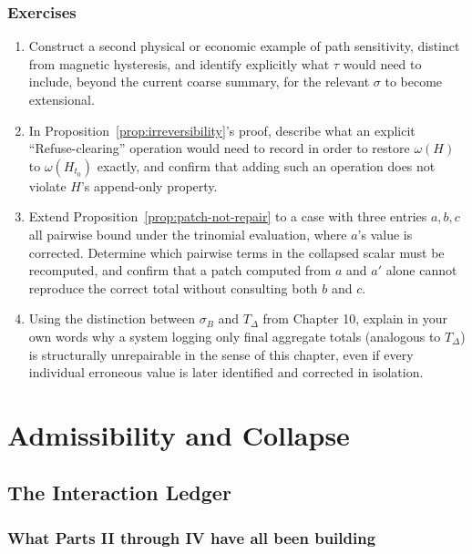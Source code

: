 \documentclass[11pt]{book}
\begin{document}
\section*{Exercises}
\begin{enumerate}
\item Construct a second physical or economic example of path sensitivity, distinct from magnetic hysteresis, and identify explicitly what $\tau$ would need to include, beyond the current coarse summary, for the relevant $\sigma$ to become extensional.
\item In Proposition~\ref{prop:irreversibility}'s proof, describe what an explicit ``Refuse-clearing'' operation would need to record in order to restore $\omega(H)$ to $\omega(H_{t_0})$ exactly, and confirm that adding such an operation does not violate $H$'s append-only property.
\item Extend Proposition~\ref{prop:patch-not-repair} to a case with three entries $a,b,c$ all pairwise bound under the trinomial evaluation, where $a$'s value is corrected. Determine which pairwise terms in the collapsed scalar must be recomputed, and confirm that a patch computed from $a$ and $a'$ alone cannot reproduce the correct total without consulting both $b$ and $c$.
\item Using the distinction between $\sigma_B$ and $T_\Delta$ from Chapter 10, explain in your own words why a system logging only final aggregate totals (analogous to $T_\Delta$) is structurally unrepairable in the sense of this chapter, even if every individual erroneous value is later identified and corrected in isolation.
\end{enumerate}

\part{Admissibility and Collapse}

\chapter{The Interaction Ledger}

\section{What Parts II through IV have all been building}
\end{document}
